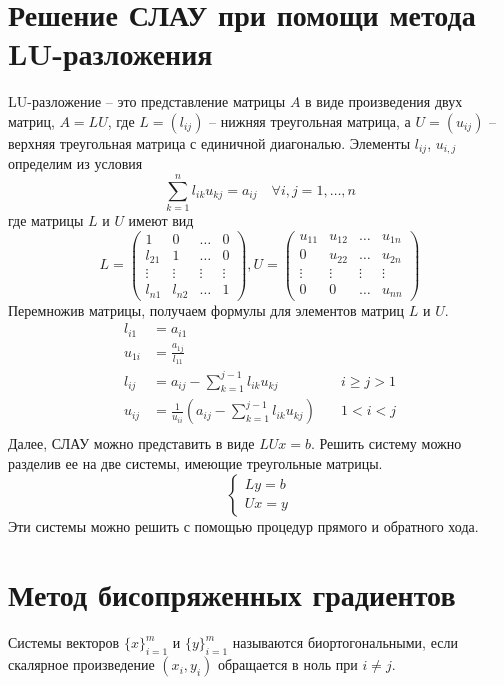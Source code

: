 \documentclass[a4paper, fontsize=14pt]{article}
\begin{document}
\section{Решение СЛАУ при помощи метода LU-разложения}

LU-разложение -- это представление матрицы $A$ в виде произведения двух матриц, $A=LU$, где
$L=(l_{ij})$ -- нижняя треугольная матрица, а $U=(u_{ij})$ -- верхняя треугольная матрица с
единичной диагональю. Элементы $l_{ij}$, $u_{i,j}$ определим из условия
$$\sum_{k=1}^{n}l_{ik}u_{kj} = a_{ij}\quad\forall i,j = 1,\dots,n$$
где матрицы $L$ и $U$ имеют вид 
$$L = 
\begin{pmatrix} 
    1 & 0 & \dots & 0 \\
    l_{21} & 1 & \dots & 0 \\
    \vdots & \vdots & \vdots &\vdots \\
    l_{n1} & l_{n2} & \dots & 1
\end{pmatrix}, 
U = 
\begin{pmatrix} 
    u_{11} & u_{12} & \dots & u_{1n} \\
    0 & u_{22} & \dots & u_{2n} \\
    \vdots & \vdots & \vdots &\vdots \\
    0 & 0 & \dots & u_{nn}
\end{pmatrix}
$$
Перемножив матрицы, получаем формулы для элементов матриц $L$ и $U$.
\begin{align*}
    l_{i1} &= a_{i1} \\
    u_{1i} &= \frac{a_{1j}}{l_{11}} \\
    l_{ij} &= a_{ij} - \sum_{k=1}^{j-1} l_{ik}u_{kj} \quad &i \ge j > 1\\
    u_{ij} &= \frac{1}{u_{ii}} \left(a_{ij} - \sum_{k=1}^{j-1} l_{ik}u_{kj}\right) \quad &1 < i < j\\
\end{align*}
Далее, СЛАУ можно представить в виде $LUx=b$. Решить систему можно разделив ее на две системы,
имеющие треугольные матрицы. 
$$
\begin{cases}
    Ly=b\\
    Ux=y
\end{cases}
$$
    Эти системы можно решить с помощью процедур прямого и обратного хода.
\section{Метод бисопряженных градиентов}
    Системы векторов $\{x\}^m_{i=1}$ и $\{y\}^m_{i=1}$ называются
биортогональными, если скалярное произведение $(x_i , y_i)$ обращается в ноль при $i\neq j$.
\end{document}
